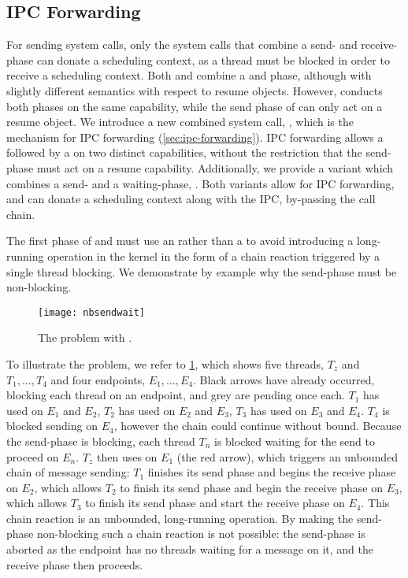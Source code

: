 \subsection{IPC Forwarding}
\label{s:ipc-forwarding}

For sending system calls, only the system calls that combine a send- and receive-phase can donate
a scheduling context, as a thread must be blocked in order to receive a scheduling context. Both
\call and \replyrecv combine a \send and \recv phase, although with slightly different semantics
with respect to resume objects. However, \call conducts both phases on the same capability, while
the send phase of \replyrecv can only act on a resume object. We introduce a new combined system
call, \nbsendrecv, which is the mechanism for IPC forwarding (\cref{sec:ipc-forwarding}). 
IPC forwarding allows a \nbsend followed by a \recv on two distinct capabilities, without the
restriction that the send-phase must act on a resume capability. 
Additionally, we provide a variant which combines a send- and a waiting-phase, \nbsendwait.
Both variants allow for IPC forwarding, and can donate a scheduling context
along with the IPC, by-passing the call chain. 

The first phase of \nbsendrecv and \nbsendwait must use an \nbsend rather than a \send
to avoid introducing a long-running operation in the kernel in the form of a chain reaction
triggered by a single thread blocking. We demonstrate by example why the send-phase must be
non-blocking.

\begin{figure}
    \texttt{[image: nbsendwait]}
    \caption{The problem with \sendrecv.}
    \label{fig:send-wait}
\end{figure}

To illustrate the problem, we refer to \cref{fig:send-wait}, which shows five threads, $T_{z}$ and
$T_{1},\ldots,T_{4}$ and four endpoints, $E_{1},\dots,E_{4}$. Black arrows have already
occurred, blocking each thread on an endpoint, and grey are pending once each. $T_{1}$ has used \sendrecv on
$E_{1}$ and $E_{2}$, $T_{2}$ has used \sendrecv on $E_{2}$ and $E_{3}$,  
$T_{3}$ has used \sendrecv on $E_{3}$ and $E_{4}$. $T_{4}$ is blocked sending on $E_{4}$,
however the chain could continue without bound.
Because the send-phase is blocking, each thread $T_{n}$ is blocked waiting for the send to proceed 
on $E_{n}$. $T_{z}$ then uses \recv on $E_{1}$ (the red arrow), which triggers an unbounded chain of message
sending: $T_{1}$ finishes its send phase and begins the receive phase on $E_{2}$, which allows
$T_{2}$ to finish its send phase and begin the receive phase on $E_{3}$, which allows $T_{3}$ to
finish its send phase and start the receive phase on $E_{4}$. This chain reaction is an
unbounded, long-running operation. By making the send-phase non-blocking such a chain reaction is not
possible: the send-phase is aborted as the endpoint has no threads waiting for a message on it, and
the receive phase then proceeds. 

